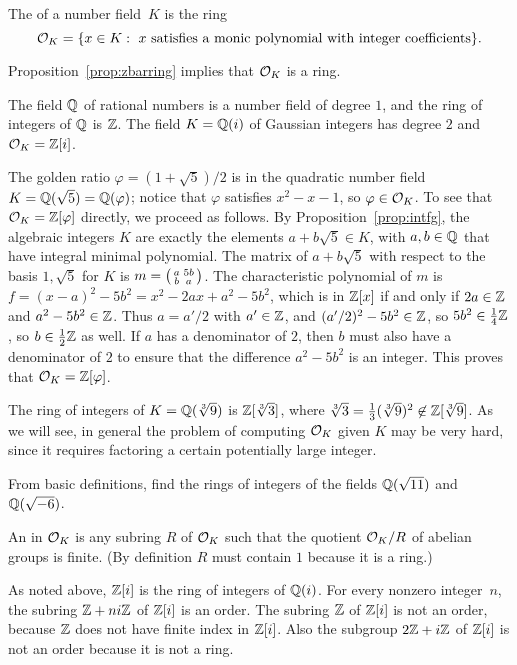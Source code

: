 \begin{definition}
	The  of a number field~$K$ is the ring
	$$
		\mathcal{O}_K = \{x \in K : \text{ $x$ satisfies a monic polynomial
		with integer coefficients}\}.
	$$
\end{definition}
Proposition~\ref{prop:zbarring} implies that $\mathcal{O}_K$ is a ring.

\begin{example}
	The field $\mathbb{Q}$ of rational numbers is a number field of degree $1$,
	and the ring of integers of $\mathbb{Q}$ is $\mathbb{Z}$.  The field $K=\mathbb{Q}(i)$ of
	Gaussian integers has degree $2$ and $\mathcal{O}_K = \mathbb{Z}[i]$.
\end{example}

\begin{example}\label{example:Qsqrt5ringofints}
	The golden ratio $\varphi =(1+\sqrt{5})/2$ is in the quadratic
	number field $K=\mathbb{Q}(\sqrt{5})=\mathbb{Q}(\varphi)$; notice that
	$\varphi$ satisfies $x^2-x-1$, so $\varphi\in\mathcal{O}_K$.
	To see that $\mathcal{O}_K = \mathbb{Z}[\varphi]$ directly, we proceed as follows.
	By Proposition~\ref{prop:intfg}, the algebraic integers $K$
	are exactly the elements $a+b\sqrt{5} \in K$, with $a,b\in\mathbb{Q}$
	that have integral minimal polynomial. The matrix of $a+b\sqrt{5}$
	with respect to the basis $1,\sqrt{5}$ for $K$ is
	$m=\left( \begin{smallmatrix}a&5b\\b&a\end{smallmatrix}\right)$. The characteristic polynomial of $m$ is
	$f = (x-a)^2 - 5b^2 = x^2 - 2ax + a^2 - 5b^2$, which is in $\mathbb{Z}[x]$
	if and only if $2a\in\mathbb{Z}$ and $a^2-5b^2\in\mathbb{Z}$. Thus $a=a'/2$ with
	$a'\in\mathbb{Z}$, and $(a'/2)^2 - 5b^2 \in\mathbb{Z}$, so $5b^2 \in \frac{1}{4}\mathbb{Z}$,
	so $b\in\frac{1}{2}\mathbb{Z}$ as well. If $a$ has a denominator of $2$,
	then $b$ must also have a denominator of $2$ to ensure that the
	difference $a^2-5b^2$ is an integer. This proves that
	$\mathcal{O}_K = \mathbb{Z}[\varphi]$.
\end{example}

\begin{example}
	The ring of integers of $K=\mathbb{Q}(\sqrt[3]{9})$ is $\mathbb{Z}[\sqrt[3]{3}]$,
	where $\sqrt[3]{3}=\frac{1}{3}(\sqrt[3]{9})^2 \not \in \mathbb{Z}[\sqrt[3]{9}]$.
	As we will see, in general the problem of computing $\mathcal{O}_K$ given $K$
	may be very hard, since it requires factoring a certain potentially
	large integer.
\end{example}

\begin{exercise}
	From basic definitions, find the rings of integers of the fields
	$\mathbb{Q}(\sqrt{11})$ and $\mathbb{Q}(\sqrt{-6})$.
\end{exercise}

\begin{definition}[Order]\label{defn:order}
	An  in $\mathcal{O}_K$ is any subring $R$ of $\mathcal{O}_K$ such that
	the quotient $\mathcal{O}_K/R$ of abelian groups is finite.
	(By definition $R$ must contain $1$ because it is a ring.)
\end{definition}
As noted above, $\mathbb{Z}[i]$ is the ring of integers of $\mathbb{Q}(i)$.  For every
nonzero integer~$n$, the subring $\mathbb{Z}+ni\mathbb{Z}$ of $\mathbb{Z}[i]$ is an order.
The subring $\mathbb{Z}$ of $\mathbb{Z}[i]$ is not an order, because $\mathbb{Z}$ does not
have finite index in $\mathbb{Z}[i]$.  Also the subgroup $2\mathbb{Z} + i\mathbb{Z}$ of
$\mathbb{Z}[i]$ is not an order because it is not a ring.

